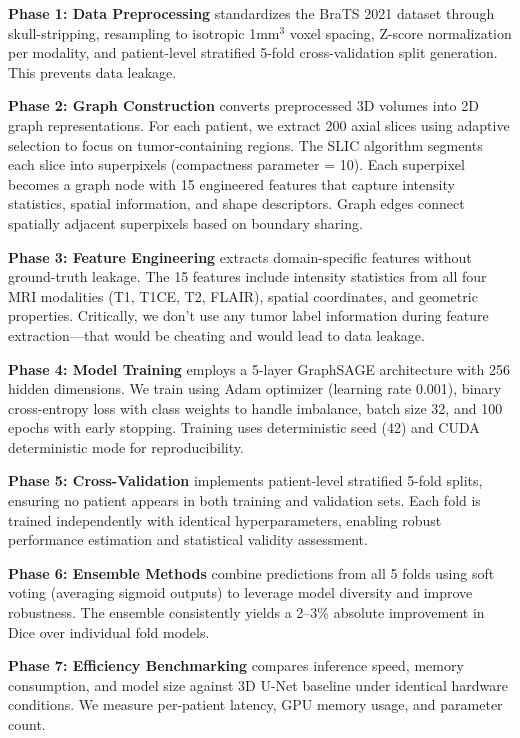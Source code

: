 \textbf{Phase 1: Data Preprocessing} standardizes the BraTS 2021 dataset through skull-stripping, resampling to isotropic 1mm$^3$ voxel spacing, Z-score normalization per modality, and patient-level stratified 5-fold cross-validation split generation. This prevents data leakage.

\textbf{Phase 2: Graph Construction} converts preprocessed 3D volumes into 2D graph representations. For each patient, we extract 200 axial slices using adaptive selection to focus on tumor-containing regions. The SLIC algorithm segments each slice into superpixels (compactness parameter = 10). Each superpixel becomes a graph node with 15 engineered features that capture intensity statistics, spatial information, and shape descriptors. Graph edges connect spatially adjacent superpixels based on boundary sharing.

\textbf{Phase 3: Feature Engineering} extracts domain-specific features without ground-truth leakage. The 15 features include intensity statistics from all four MRI modalities (T1, T1CE, T2, FLAIR), spatial coordinates, and geometric properties. Critically, we don't use any tumor label information during feature extraction—that would be cheating and would lead to data leakage.

\textbf{Phase 4: Model Training} employs a 5-layer GraphSAGE architecture with 256 hidden dimensions. We train using Adam optimizer (learning rate 0.001), binary cross-entropy loss with class weights to handle imbalance, batch size 32, and 100 epochs with early stopping. Training uses deterministic seed (42) and CUDA deterministic mode for reproducibility.

\textbf{Phase 5: Cross-Validation} implements patient-level stratified 5-fold splits, ensuring no patient appears in both training and validation sets. Each fold is trained independently with identical hyperparameters, enabling robust performance estimation and statistical validity assessment.

\textbf{Phase 6: Ensemble Methods} combine predictions from all 5 folds using soft voting (averaging sigmoid outputs) to leverage model diversity and improve robustness. The ensemble consistently yields a 2--3\% absolute improvement in Dice over individual fold models.

\textbf{Phase 7: Efficiency Benchmarking} compares inference speed, memory consumption, and model size against 3D U-Net baseline under identical hardware conditions. We measure per-patient latency, GPU memory usage, and parameter count.

